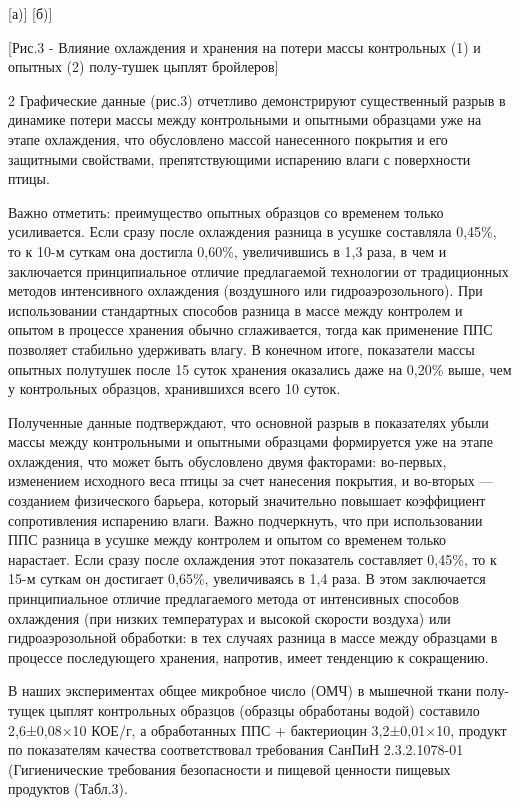 \begin{figs}
[а)]
[б)]
\end{figs}

[Рис.3 - Влияние охлаждения и хранения
на потери массы контрольных (1) и опытных (2) полу-тушек цыплят
бройлеров]

\begin{multicols}{2}
Графические данные (рис.3) отчетливо демонстрируют существенный разрыв
в динамике потери массы между контрольными и опытными образцами уже на
этапе охлаждения, что обусловлено массой нанесенного покрытия и его
защитными свойствами, препятствующими испарению влаги с поверхности
птицы.

Важно отметить: преимущество опытных образцов со временем только
усиливается. Если сразу после охлаждения разница в усушке составляла
0,45\%, то к 10-м суткам она достигла 0,60\%, увеличившись в 1,3 раза, в
чем и заключается принципиальное отличие предлагаемой технологии от
традиционных методов интенсивного охлаждения (воздушного или
гидроаэрозольного). При использовании стандартных способов разница в
массе между контролем и опытом в процессе хранения обычно сглаживается,
тогда как применение ППС позволяет стабильно удерживать влагу. В
конечном итоге, показатели массы опытных полутушек после 15 суток
хранения оказались даже на 0,20\% выше, чем у контрольных образцов,
хранившихся всего 10 суток.

Полученные данные подтверждают, что основной разрыв в показателях убыли
массы между контрольными и опытными образцами формируется уже на этапе
охлаждения, что может быть обусловлено двумя факторами: во-первых,
изменением исходного веса птицы за счет нанесения покрытия, и во-вторых
--- созданием физического барьера, который значительно повышает
коэффициент сопротивления испарению влаги. Важно подчеркнуть, что при
использовании ППС разница в усушке между контролем и опытом со временем
только нарастает. Если сразу после охлаждения этот показатель составляет
0,45\%, то к 15-м суткам он достигает 0,65\%, увеличиваясь в 1,4 раза. В
этом заключается принципиальное отличие предлагаемого метода от
интенсивных способов охлаждения (при низких температурах и высокой
скорости воздуха) или гидроаэрозольной обработки: в тех случаях разница
в массе между образцами в процессе последующего хранения, напротив,
имеет тенденцию к сокращению.

В наших экспериментах общее микробное число (ОМЧ) в мышечной ткани
полу-тущек цыплят контрольных образцов (образцы обработаны водой)
составило 2,6±0,08×10 КОЕ/г, а обработанных ППС +
бактериоцин 3,2±0,01×10, продукт по показателям
качества соответствовал требования СанПиН 2.3.2.1078-01 (Гигиенические
требования безопасности и пищевой ценности пищевых продуктов (Табл.3).
\end{multicols}

